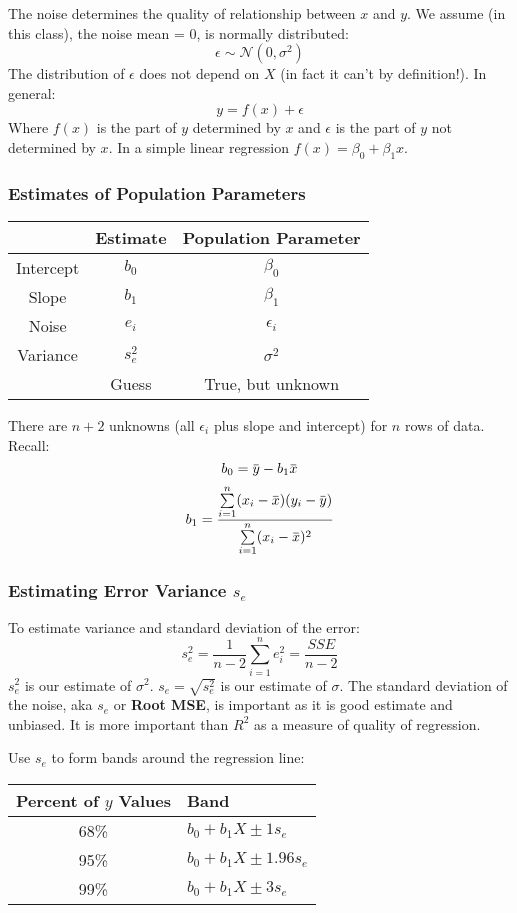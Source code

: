 \documentclass[11pt, oneside]{article}   	%
\newcommand{\overbar}[1]{\mkern 1.5mu\overline{\mkern-1.5mu#1\mkern-1.5mu}\mkern 1.5mu}
\begin{document}
The noise determines the quality of relationship between $x$ and $y$. We assume (in this class), the noise mean = 0, is normally distributed:
\[
\epsilon \sim \mathcal{N}(0,\sigma^2)
\]
The distribution of $\epsilon$ does not depend on $X$ (in fact it can't by definition!). In general:
\[
y = f(x) + \epsilon
\]
Where $f(x)$ is the part of $y$ determined by $x$ and $\epsilon$ is the part of $y$ not determined by $x$. In a simple linear regression $f(x) = \beta_0 + \beta_1 x$.

\subsubsection{Estimates of Population Parameters}
\begin{tabular}{| c | c | c| }
\hline
 & Estimate &  Population  Parameter \\
 \hline
 Intercept & $b_0$ & $\beta_0$ \\
 Slope & $b_1$ & $\beta_1$ \\
 Noise & $e_i$ & $\epsilon_i$ \\
 Variance & $s_e^2$ & $\sigma^2$ \\
\hline
& Guess & True, but unknown \\
\hline
\end{tabular}

There are $n+2$ unknowns (all $\epsilon_i$ plus slope and intercept) for $n$ rows of data. Recall:
\[
b_0 = \overbar{y} - b_1 \overbar{x}
\]
\[
b_1 = \frac {\sum\limits_{i=1}^n (x_i - \overbar{x})(y_i - \overbar{y})}  {\sum\limits_{i=1}^n (x_i - \overbar{x})^2}
\]

\subsubsection{Estimating Error Variance $s_e$}
To estimate variance and standard deviation of the error:
\[
s_e^2 = \frac{1}{n-2} \sum\limits_{i=1}^n e_i^2 = \frac{SSE}{n - 2}
\]
$s_e^2$ is our estimate of $\sigma^2$. $s_e = \sqrt{s_e^2}$ is our estimate of $\sigma$. The standard deviation of the noise, aka $s_e$ or \textbf{Root MSE}, is important as it is good estimate and unbiased. It is more important than $R^2$ as a measure of quality of regression.

Use $s_e$ to form bands around the regression line:

\begin{tabular}{c | l}
Percent of $y$ Values & Band \\
\hline
68\% & $b_0 + b_1 X \pm 1 s_e$ \\
95\% & $b_0 + b_1 X \pm 1.96 s_e$ \\
99\% & $b_0 + b_1 X \pm 3 s_e$ \\
\end{tabular}
\end{document}
